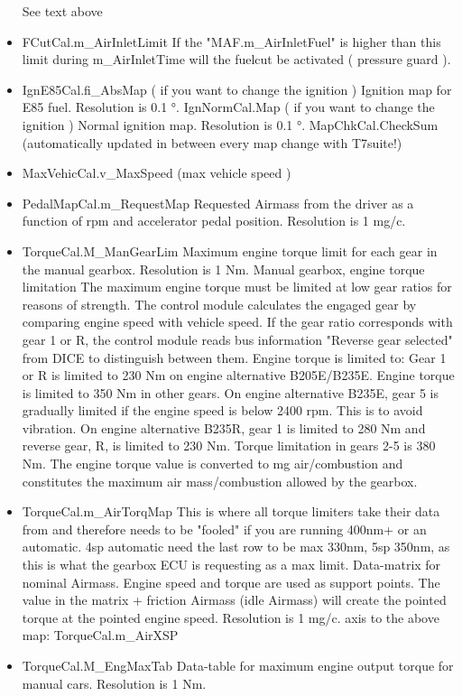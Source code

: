 \documentclass[11pt,a4paper]{book}
\begin{document}
\begin{itemize}
See text above
    \item
FCutCal.m\_AirInletLimit
If the "MAF.m\_AirInletFuel" is higher than this limit during m\_AirInletTime will the fuelcut be activated
( pressure guard ).
    \item
IgnE85Cal.fi\_AbsMap ( if you want to change the ignition )
Ignition map for E85 fuel. Resolution is 0.1 °.
IgnNormCal.Map ( if you want to change the ignition )
Normal ignition map. Resolution is 0.1 °.
MapChkCal.CheckSum (automatically updated in between every map change with T7suite!)
    \item
MaxVehicCal.v\_MaxSpeed (max vehicle speed )
    \item
PedalMapCal.m\_RequestMap
Requested Airmass from the driver as a function of rpm and accelerator pedal position. Resolution is 1
mg/c.
    \item
TorqueCal.M\_ManGearLim
Maximum engine torque limit for each gear in the manual gearbox. Resolution is 1 Nm.
Manual gearbox, engine torque limitation
The maximum engine torque must be limited at low gear ratios for reasons of strength.
The control module calculates the engaged gear by comparing engine speed with vehicle speed.
If the gear ratio corresponds with gear 1 or R, the control module reads bus information "Reverse
gear selected" from DICE to distinguish between them.
Engine torque is limited to:
Gear 1 or R is limited to 230 Nm on engine alternative B205E/B235E. Engine torque is limited to 350
Nm in other gears.
On engine alternative B235E, gear 5 is gradually limited if the engine speed is below 2400 rpm. This is
to avoid vibration.
On engine alternative B235R, gear 1 is limited to 280 Nm and reverse gear, R, is limited to 230 Nm.
Torque limitation in gears 2-5 is 380 Nm.
The engine torque value is converted to mg air/combustion and constitutes the maximum air
mass/combustion allowed by the gearbox.
    \item
TorqueCal.m\_AirTorqMap This is where all torque limiters take their data from and therefore needs
to be "fooled" if you are running 400nm+ or an automatic. 4sp automatic need the last row to be max
330nm, 5sp 350nm, as this is what the gearbox ECU is requesting as a max limit.
Data-matrix for nominal Airmass. Engine speed and torque are used as support points. The value in
the matrix + friction Airmass (idle Airmass) will create the pointed torque at the pointed engine speed.
Resolution is 1 mg/c.
axis to the above map: TorqueCal.m\_AirXSP
    \item
TorqueCal.M\_EngMaxTab
Data-table for maximum engine output torque for manual cars. Resolution is 1 Nm.

\end{itemize}
\end{document}
